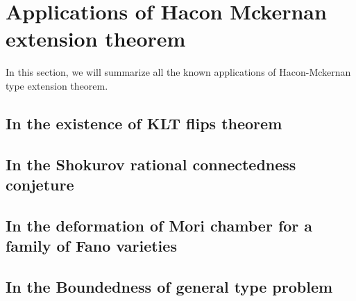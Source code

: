 \documentclass[11pt]{article}
\theoremstyle{definition}
\begin{document}
	\section{Applications of Hacon Mckernan extension theorem}
	In this section, we will summarize all the known applications of Hacon-Mckernan type extension theorem.
	\subsection{In the existence of KLT flips theorem}
	
	\subsection{In the Shokurov rational connectedness conjeture}
	
	\subsection{In the deformation of Mori chamber for a family of Fano varieties}
	
	\subsection{In the Boundedness of general type problem}
	
	
	
\end{document}
